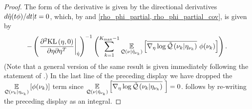 \begin{proof}
The form of the derivative is given by the directional derivatives $d \hat\eta(t
\phi) / dt | t = 0$, which, by  and \eqref{rho_phi_partial,
rho_phi_partial_cov}, is given by
%
\begin{align*}
%
-\left(\fracat{\partial^2 \KL{\eta, \phiz}}
                {\partial \eta \partial \eta^T}
                {\etaopt}\right)^{-1}
\left(
    \sumkm \expect{\q(\nu \vert \etaoptnuk)}
                  {\lqgradbar{\nuk \vert \etanuk}
                   \phi(\nuk) }
\right).
%
\end{align*}
%
(Note that a general version of the same result is given immediately following
the statement of \citet[Theorem 4.B(c)]{zeidler:2013:functional}.)  In the last
line of the preceding display we have dropped the $\underset{\mathcal{Q}(\nu_{k} \vert
\eta_{\nu_{k}})}{\mathbb{E}}\left[\phi(\nu_{k})\right]$ term since $\underset{\mathcal{Q}(\nu \vert \hat\eta_{\nu_{k}})}{\mathbb{E}}\left[\overline{{\nabla_\eta \log \tilde{\mathcal{Q}}}\left(\nu_{k} \vert \eta_{\nu_{k}}\right)}\,\,\right] = 0$.   follows by
re-writing the preceding display as an integral.
%
\end{proof}
%

